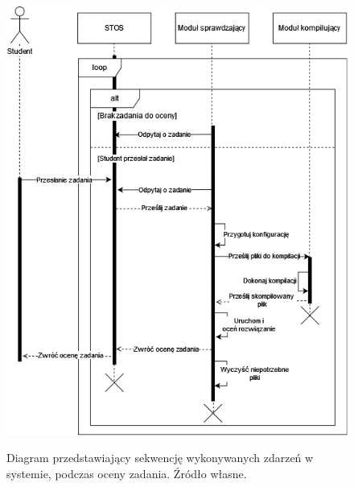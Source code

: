 \begin{figure}
	\begin{center}
		\resizebox{1.0\textwidth}{!} {
			\includegraphics{img/1/d_sek_1.png}
		}
		\caption[Diagram sekwencji komponentów]{Diagram przedstawiający sekwencję wykonywanych zdarzeń w systemie, podczas oceny zadania. Źródło własne.}
	\end{center}
\end{figure}

